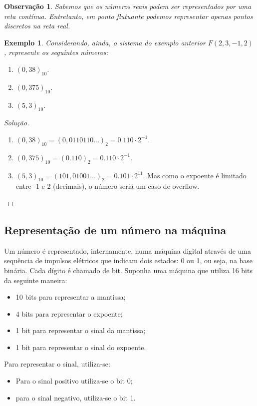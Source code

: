 \documentclass[
	12pt,				%
	openright,			%
	twoside,			%
	a4paper,			%
	english,			%
	french,				%
	brazil,				%
	sumario=tradicional
]{abntex2}
\newtheorem{example}{Exemplo}
\newtheorem{remark}{Observação}
\newenvironment{solution}{
	\begin{proof}[Solução]
}{\end{proof}}
\numberwithin{example}{chapter}
\numberwithin{remark}{chapter}
\numberwithin{definition}{chapter}
\numberwithin{figure}{chapter}
\begin{document}
\begin{remark}
    Sabemos que os números reais podem ser representados por uma reta contínua. Entretanto, em ponto flutuante podemos representar apenas pontos discretos na reta real.
\end{remark}

\begin{example}
    Considerando, ainda, o sistema do exemplo anterior $F(2, 3, -1, 2)$, represente os seguintes números:
    \begin{enumerate}
        \item $(0,38)_{10}$.
        \item $(0,375)_{10}$.
        \item $(5,3)_{10}$.
    \end{enumerate}
\end{example}
\begin{solution}\hfill
    \begin{enumerate}
        \item $(0,38)_{10} = (0,0110110\dots)_2=0.110\cdot 2^{-1}$.
        \item $(0,375)_{10} = (0.110)_2 = 0.110\cdot 2^{-1}$.
        \item $(5,3)_{10} = (101,01001\dots)_2 = 0.101\cdot 2^{11}$. Mas como o expoente é limitado entre -1 e 2 (decimais), o número seria um caso de overflow.
    \end{enumerate}
\end{solution}

\subsection{Representação de um número na máquina}

Um número é representado, internamente, numa máquina digital através de uma sequência de impulsos elétricos que indicam dois estados: 0 ou 1, ou seja, na base binária. Cada dígito é chamado de bit. Suponha uma máquina que utiliza 16 bits da seguinte maneira:
\begin{itemize}
    \item 10 bits para representar a mantissa;
    \item 4 bits para representar o expoente;
    \item 1 bit para representar o sinal da mantissa;
    \item 1 bit para representar o sinal do expoente.
\end{itemize}

Para representar o sinal, utiliza-se:
\begin{itemize}
    \item Para o sinal positivo utiliza-se o bit 0;
    \item para o sinal negativo, utiliza-se o bit 1.
\end{itemize}
\end{document}
